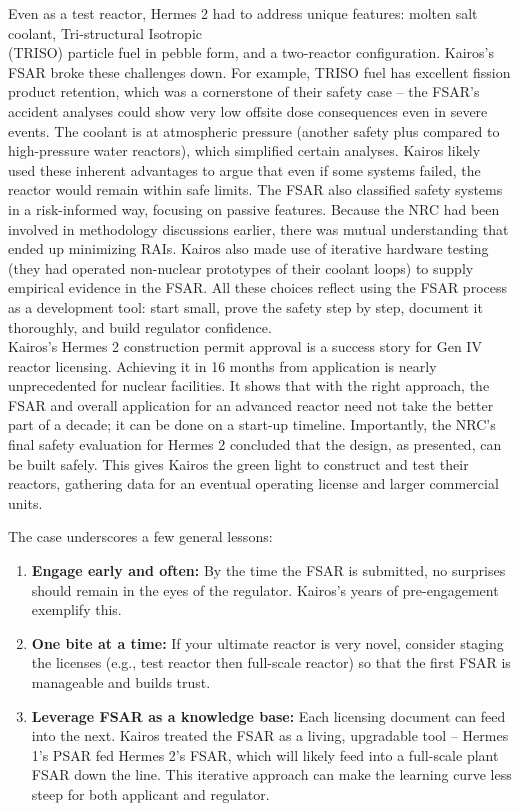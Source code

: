 \documentclass[5p,authoryear]{elsarticle}
\begin{document}
Even as a test reactor, Hermes 2 had to address unique features: molten salt coolant, Tri-structural Isotropic \\(TRISO) particle fuel in pebble form, and a two-reactor configuration. Kairos’s FSAR broke these challenges down. For example, TRISO fuel has excellent fission product retention, which was a cornerstone of their safety case – the FSAR’s accident analyses could show very low offsite dose consequences even in severe events. The coolant is at atmospheric pressure (another safety plus compared to high-pressure water reactors), which simplified certain analyses. Kairos likely used these inherent advantages to argue that even if some systems failed, the reactor would remain within safe limits. The FSAR also classified safety systems in a risk-informed way, focusing on passive features. Because the NRC had been involved in methodology discussions earlier, there was mutual understanding that ended up minimizing RAIs. Kairos also made use of iterative hardware testing (they had operated non-nuclear prototypes of their coolant loops) to supply empirical evidence in the FSAR. All these choices reflect using the FSAR process as a development tool: start small, prove the safety step by step, document it thoroughly, and build regulator confidence. \\

Kairos's Hermes 2 construction permit approval is a success story for Gen IV reactor licensing. Achieving it in 16 months from application is nearly unprecedented for nuclear facilities. It shows that with the right approach, the FSAR and overall application for an advanced reactor need not take the better part of a decade; it can be done on a start-up timeline. Importantly, the NRC’s final safety evaluation for Hermes 2 concluded that the design, as presented, can be built safely. This gives Kairos the green light to construct and test their reactors, gathering data for an eventual operating license and larger commercial units. 

The case underscores a few general lessons: 
\vspace{0.2cm}

\begin{enumerate}
    \item \textbf{Engage early and often:} By the time the FSAR is submitted, no surprises should remain in the eyes of the regulator. Kairos’s years of pre-engagement exemplify this.
    \item \textbf{One bite at a time:} If your ultimate reactor is very novel, consider staging the licenses (e.g., test reactor then full-scale reactor) so that the first FSAR is manageable and builds trust. 
    \item \textbf{Leverage FSAR as a knowledge base:} Each licensing document can feed into the next. Kairos treated the FSAR as a living, upgradable tool – Hermes 1’s PSAR fed Hermes 2’s FSAR, which will likely feed into a full-scale plant FSAR down the line. This iterative approach can make the learning curve less steep for both applicant and regulator.
\end{enumerate} 
\end{document}
